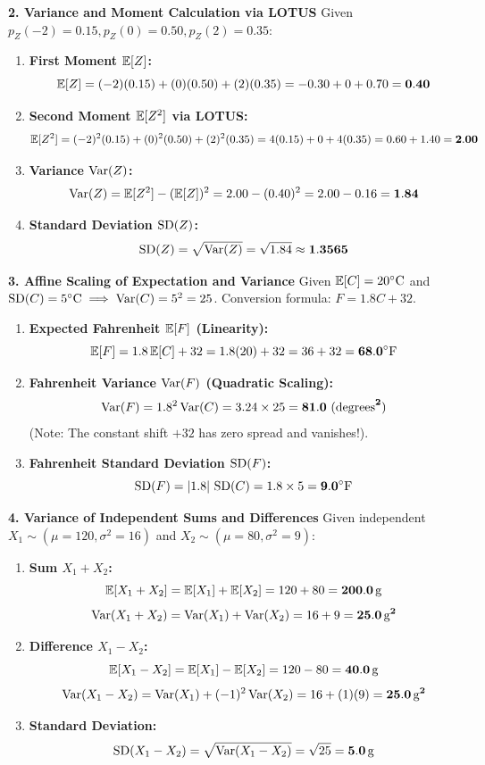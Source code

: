 \textbf{2. Variance and Moment Calculation via LOTUS}
Given $p_Z(-2) = 0.15, p_Z(0) = 0.50, p_Z(2) = 0.35$:
\begin{enumerate}
    \item \textbf{First Moment $\mathbb{E}[Z]$:}
    $$\mathbb{E}[Z] = (-2)(0.15) + (0)(0.50) + (2)(0.35) = -0.30 + 0 + 0.70 = \mathbf{0.40}$$
    \item \textbf{Second Moment $\mathbb{E}[Z^2]$ via LOTUS:}
    $$\mathbb{E}[Z^2] = (-2)^2(0.15) + (0)^2(0.50) + (2)^2(0.35) = 4(0.15) + 0 + 4(0.35) = 0.60 + 1.40 = \mathbf{2.00}$$
    \item \textbf{Variance $\operatorname{Var}(Z)$:}
    $$\operatorname{Var}(Z) = \mathbb{E}[Z^2] - (\mathbb{E}[Z])^2 = 2.00 - (0.40)^2 = 2.00 - 0.16 = \mathbf{1.84}$$
    \item \textbf{Standard Deviation $\operatorname{SD}(Z)$:}
    $$\operatorname{SD}(Z) = \sqrt{\operatorname{Var}(Z)} = \sqrt{1.84} \approx \mathbf{1.3565}$$
\end{enumerate}

\textbf{3. Affine Scaling of Expectation and Variance}
Given $\mathbb{E}[C] = 20^\circ\text{C}$ and $\operatorname{SD}(C) = 5^\circ\text{C} \implies \operatorname{Var}(C) = 5^2 = 25$.
Conversion formula: $F = 1.8 C + 32$.
\begin{enumerate}
    \item \textbf{Expected Fahrenheit $\mathbb{E}[F]$ (Linearity):}
    $$\mathbb{E}[F] = 1.8\,\mathbb{E}[C] + 32 = 1.8(20) + 32 = 36 + 32 = \mathbf{68.0^\circ\text{F}}$$
    \item \textbf{Fahrenheit Variance $\operatorname{Var}(F)$ (Quadratic Scaling):}
    $$\operatorname{Var}(F) = 1.8^2 \operatorname{Var}(C) = 3.24 \times 25 = \mathbf{81.0 \text{ (degrees}^2\text{)}}$$
    (Note: The constant shift $+32$ has zero spread and vanishes!).
    \item \textbf{Fahrenheit Standard Deviation $\operatorname{SD}(F)$:}
    $$\operatorname{SD}(F) = |1.8|\,\operatorname{SD}(C) = 1.8 \times 5 = \mathbf{9.0^\circ\text{F}}$$
\end{enumerate}

\textbf{4. Variance of Independent Sums and Differences}
Given independent $X_1 \sim (\mu = 120, \sigma^2 = 16)$ and $X_2 \sim (\mu = 80, \sigma^2 = 9)$:
\begin{enumerate}
    \item \textbf{Sum $X_1 + X_2$:}
    $$\mathbb{E}[X_1 + X_2] = \mathbb{E}[X_1] + \mathbb{E}[X_2] = 120 + 80 = \mathbf{200.0\,\text{g}}$$
    $$\operatorname{Var}(X_1 + X_2) = \operatorname{Var}(X_1) + \operatorname{Var}(X_2) = 16 + 9 = \mathbf{25.0\,\text{g}^2}$$
    \item \textbf{Difference $X_1 - X_2$:}
    $$\mathbb{E}[X_1 - X_2] = \mathbb{E}[X_1] - \mathbb{E}[X_2] = 120 - 80 = \mathbf{40.0\,\text{g}}$$
    $$\operatorname{Var}(X_1 - X_2) = \operatorname{Var}(X_1) + (-1)^2\operatorname{Var}(X_2) = 16 + (1)(9) = \mathbf{25.0\,\text{g}^2}$$
    \item \textbf{Standard Deviation:}
    $$\operatorname{SD}(X_1 - X_2) = \sqrt{\operatorname{Var}(X_1 - X_2)} = \sqrt{25} = \mathbf{5.0\,\text{g}}$$
\end{enumerate}

